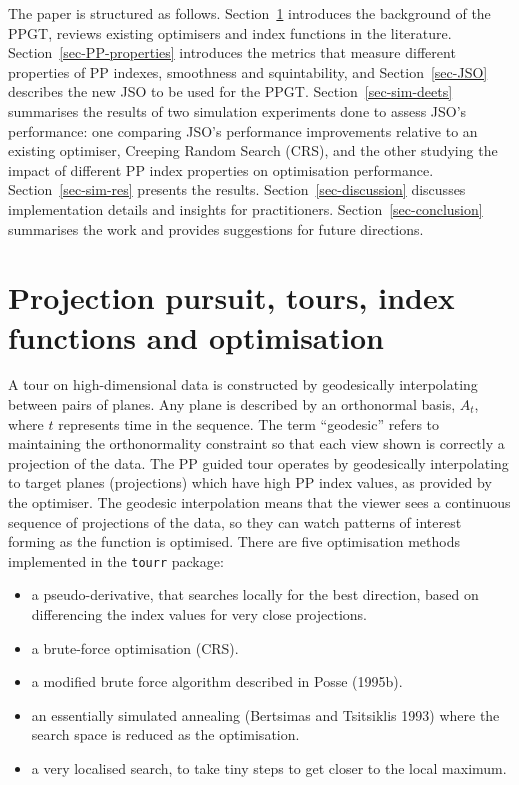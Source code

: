\documentclass[
  12pt,
]{interact}
\providecommand{\tightlist}{%
  \setlength{\itemsep}{0pt}\setlength{\parskip}{0pt}}\usepackage{longtable,booktabs,array}
\theoremstyle{plain}
\begin{document}
The paper is structured as follows. Section~\ref{sec-background}
introduces the background of the PPGT, reviews existing optimisers and
index functions in the literature. Section~\ref{sec-PP-properties}
introduces the metrics that measure different properties of PP indexes,
smoothness and squintability, and Section~\ref{sec-JSO} describes the
new JSO to be used for the PPGT. Section~\ref{sec-sim-deets} summarises
the results of two simulation experiments done to assess JSO's
performance: one comparing JSO's performance improvements relative to an
existing optimiser, Creeping Random Search (CRS), and the other studying
the impact of different PP index properties on optimisation performance.
Section~\ref{sec-sim-res} presents the results.
Section~\ref{sec-discussion} discusses implementation details and
insights for practitioners. Section~\ref{sec-conclusion} summarises the
work and provides suggestions for future directions.

\hypertarget{sec-background}{%
\section{Projection pursuit, tours, index functions and
optimisation}\label{sec-background}}

A tour on high-dimensional data is constructed by geodesically
interpolating between pairs of planes. Any plane is described by an
orthonormal basis, \(A_t\), where \(t\) represents time in the sequence.
The term ``geodesic'' refers to maintaining the orthonormality
constraint so that each view shown is correctly a projection of the
data. The PP guided tour operates by geodesically interpolating to
target planes (projections) which have high PP index values, as provided
by the optimiser. The geodesic interpolation means that the viewer sees
a continuous sequence of projections of the data, so they can watch
patterns of interest forming as the function is optimised. There are
five optimisation methods implemented in the \texttt{tourr} package:

\begin{itemize}
\tightlist
\item
  a pseudo-derivative, that searches locally for the best direction,
  based on differencing the index values for very close projections.
\item
  a brute-force optimisation (CRS).
\item
  a modified brute force algorithm described in Posse (1995b).
\item
  an essentially simulated annealing (Bertsimas and Tsitsiklis 1993)
  where the search space is reduced as the optimisation.
\item
  a very localised search, to take tiny steps to get closer to the local
  maximum.
\end{itemize}
\end{document}
